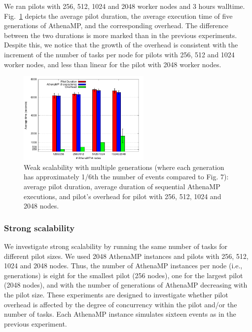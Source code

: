 We ran pilots with 256, 512, 1024 and 2048 worker nodes and 3 hours walltime.
Fig.~\ref{fig:weakScal2a} depicts the average pilot duration, the average
execution time of five generations of AthenaMP, and the corresponding
overhead. The difference between the two durations is more marked than in the
previous experiments. Despite this, we notice that the growth of the overhead
is consistent with the increment of the number of tasks per node for pilots
with 256, 512 and 1024 worker nodes, and less than linear for the pilot with
2048 worker nodes.

\begin{figure}[!t]
    \includegraphics[height=4.5cm,width=\columnwidth]{weak2.pdf}
    \vspace{-0.3in}
    \caption{Weak scalability with multiple generations (where each
    generation has approximately 1/6th the number of events compared to Fig.
    7): average pilot duration, average duration of sequential AthenaMP
    executions, and pilot's overhead for pilot with 256, 512, 1024 and 2048
    nodes.}\label{fig:weakScal2a}
\end{figure}


\subsubsection{Strong scalability}

We investigate strong scalability by running the same number of tasks for
different pilot sizes. We used 2048 AthenaMP instances and pilots with 256,
512, 1024 and 2048 nodes. Thus, the number of AthenaMP instances per node
(i.e., generations) is eight for the smallest pilot (256 nodes), one for the
largest pilot (2048 nodes), and with the number of generations of AthenaMP
decreasing with the pilot size. These experiments are designed to investigate
whether pilot overhead is affected by the degree of concurrency within the
pilot and/or the number of tasks. Each AthenaMP instance simulates sixteen
events as in the previous experiment.

